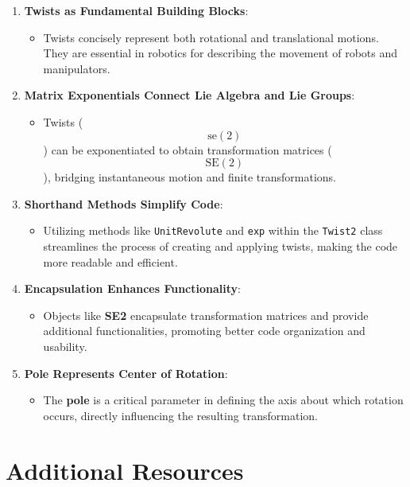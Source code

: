 \documentclass[12pt]{article}
\begin{document}
\begin{enumerate}
    \item \textbf{Twists as Fundamental Building Blocks}:
    \begin{itemize}
        \item Twists concisely represent both rotational and translational motions. They are essential in robotics for describing the movement of robots and manipulators.
    \end{itemize}
    
    \item \textbf{Matrix Exponentials Connect Lie Algebra and Lie Groups}:
    \begin{itemize}
        \item Twists ($$\text{se}(2)$$) can be exponentiated to obtain transformation matrices ($$\text{SE}(2)$$), bridging instantaneous motion and finite transformations.
    \end{itemize}
    
    \item \textbf{Shorthand Methods Simplify Code}:
    \begin{itemize}
        \item Utilizing methods like \texttt{UnitRevolute} and \texttt{exp} within the \texttt{Twist2} class streamlines the process of creating and applying twists, making the code more readable and efficient.
    \end{itemize}
    
    \item \textbf{Encapsulation Enhances Functionality}:
    \begin{itemize}
        \item Objects like \textbf{SE2} encapsulate transformation matrices and provide additional functionalities, promoting better code organization and usability.
    \end{itemize}
    
    \item \textbf{Pole Represents Center of Rotation}:
    \begin{itemize}
        \item The \textbf{pole} is a critical parameter in defining the axis about which rotation occurs, directly influencing the resulting transformation.
    \end{itemize}
\end{enumerate}

\section{Additional Resources}
\end{document}
